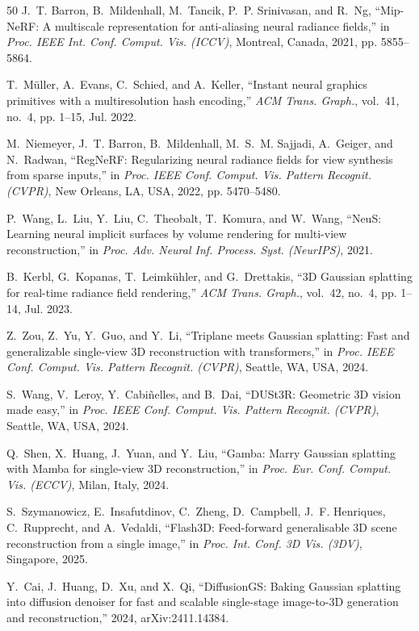 \documentclass[journal]{IEEEtran}
\begin{document}
\begin{thebibliography}{50}
 J.~T. Barron, B.~Mildenhall, M.~Tancik, P.~P. Srinivasan, and R.~Ng, ``Mip-NeRF: A multiscale representation for anti-aliasing neural radiance fields,'' in \textit{Proc. IEEE Int. Conf. Comput. Vis. (ICCV)}, Montreal, Canada, 2021, pp. 5855--5864.

 T.~M\"uller, A.~Evans, C.~Schied, and A.~Keller, ``Instant neural graphics primitives with a multiresolution hash encoding,'' \textit{ACM Trans. Graph.}, vol.~41, no.~4, pp. 1--15, Jul. 2022.

 M.~Niemeyer, J.~T. Barron, B.~Mildenhall, M.~S.~M. Sajjadi, A.~Geiger, and N.~Radwan, ``RegNeRF: Regularizing neural radiance fields for view synthesis from sparse inputs,'' in \textit{Proc. IEEE Conf. Comput. Vis. Pattern Recognit. (CVPR)}, New Orleans, LA, USA, 2022, pp. 5470--5480.

 P.~Wang, L.~Liu, Y.~Liu, C.~Theobalt, T.~Komura, and W.~Wang, ``NeuS: Learning neural implicit surfaces by volume rendering for multi-view reconstruction,'' in \textit{Proc. Adv. Neural Inf. Process. Syst. (NeurIPS)}, 2021.

 B.~Kerbl, G.~Kopanas, T.~Leimk\"uhler, and G.~Drettakis, ``3D Gaussian splatting for real-time radiance field rendering,'' \textit{ACM Trans. Graph.}, vol.~42, no.~4, pp. 1--14, Jul. 2023.

 Z.~Zou, Z.~Yu, Y.~Guo, and Y.~Li, ``Triplane meets Gaussian splatting: Fast and generalizable single-view 3D reconstruction with transformers,'' in \textit{Proc. IEEE Conf. Comput. Vis. Pattern Recognit. (CVPR)}, Seattle, WA, USA, 2024.

 S.~Wang, V.~Leroy, Y.~Cabi\~nelles, and B.~Dai, ``DUSt3R: Geometric 3D vision made easy,'' in \textit{Proc. IEEE Conf. Comput. Vis. Pattern Recognit. (CVPR)}, Seattle, WA, USA, 2024.

 Q.~Shen, X.~Huang, J.~Yuan, and Y.~Liu, ``Gamba: Marry Gaussian splatting with Mamba for single-view 3D reconstruction,'' in \textit{Proc. Eur. Conf. Comput. Vis. (ECCV)}, Milan, Italy, 2024.

 S.~Szymanowicz, E.~Insafutdinov, C.~Zheng, D.~Campbell, J.~F. Henriques, C.~Rupprecht, and A.~Vedaldi, ``Flash3D: Feed-forward generalisable 3D scene reconstruction from a single image,'' in \textit{Proc. Int. Conf. 3D Vis. (3DV)}, Singapore, 2025.

 Y.~Cai, J.~Huang, D.~Xu, and X.~Qi, ``DiffusionGS: Baking Gaussian splatting into diffusion denoiser for fast and scalable single-stage image-to-3D generation and reconstruction,'' 2024, arXiv:2411.14384.


\end{thebibliography}
\end{document}

